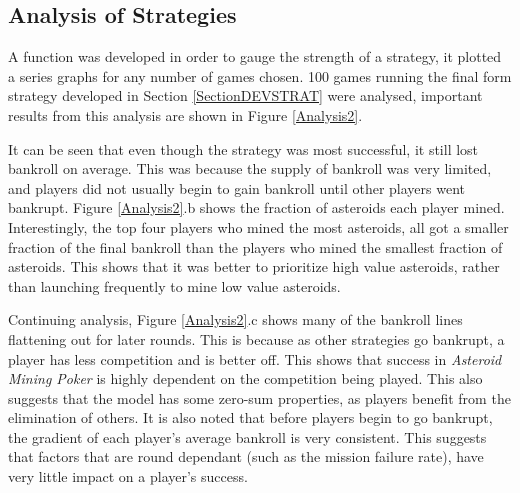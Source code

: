 \documentclass[11pt, twoside]{article}
\begin{document}
\subsection{Analysis of Strategies} \label{Section33}

A function was developed in order to gauge the strength of a strategy, it plotted a series graphs for any number of games chosen. 100 games running the final form strategy developed in Section \ref{SectionDEVSTRAT} were analysed, important results from this analysis are shown in Figure \ref{Analysis2}.

It can be seen that even though the strategy was most successful, it still lost bankroll on average. This was because the supply of bankroll was very limited, and players did not usually begin to gain bankroll until other players went bankrupt. Figure \ref{Analysis2}.b shows the fraction of asteroids each player mined. Interestingly, the top four players who mined the most asteroids, all got a smaller fraction of the final bankroll than the players who mined the smallest fraction of asteroids. This shows that it was better to prioritize high value asteroids, rather than launching frequently to mine low value asteroids.

Continuing analysis, Figure \ref{Analysis2}.c shows many of the bankroll lines flattening out for later rounds. This is because as other strategies go bankrupt, a player has less competition and is better off. This shows that success in \textit{Asteroid Mining Poker} is highly dependent on the competition being played. This also suggests that the model has some zero-sum properties, as players benefit from the elimination of others. It is also noted that before players begin to go bankrupt, the gradient of each player's average bankroll is very consistent. This suggests that factors that are round dependant (such as the mission failure rate), have very little impact on a player's success.
\end{document}
